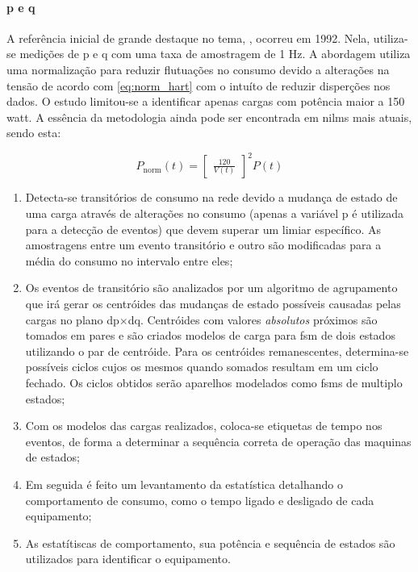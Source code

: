 \paragraph{\acrlong{p} e \acrlong{q}}

A referência inicial de grande destaque no tema,
\cite{nilm_hart_1992_8}, ocorreu em 1992. Nela, utiliza-se medições de
\gls{p} e \gls{q} com uma taxa de amostragem de 1 Hz. A abordagem
utiliza uma normalização para reduzir flutuações no consumo devido a
alterações na tensão de acordo com \ref{eq:norm_hart} com o intuíto de
reduzir disperções nos dados. O estudo limitou-se a identificar apenas
cargas com potência maior a 150 \acrshort{watt}. A essência da
metodologia ainda pode ser encontrada em \glspl{nilm} mais atuais, sendo
esta: 

\begin{equation} \label{eq:norm_hart}
P_{\text{norm}}(t) = 
\begin{bmatrix}
\frac{120}{V(t)}
\end{bmatrix}^2
P(t)
\end{equation}

\begin{enumerate}
\item Detecta-se transitórios de consumo na rede devido a mudança de
estado de uma carga através de alterações no consumo (apenas a
variável \gls{p} é utilizada para a detecção de eventos) que devem
superar um limiar específico. As amostragens entre um evento
transitório e outro são modificadas para a média do consumo no
intervalo entre eles; 
\item Os eventos de transitório são analizados por um algoritmo de
agrupamento que irá gerar os centróides das mudanças de estado
possíveis causadas pelas cargas no plano
\acrshort{dp}$\times$\acrshort{dq}.
Centróides com valores \emph{absolutos} próximos são tomados em
pares e são criados modelos de carga para \gls{fsm} de dois
estados utilizando o par de centróide. Para os centróides remanescentes, determina-se possíveis
ciclos cujos os mesmos quando somados resultam em um ciclo fechado. Os
ciclos obtidos serão aparelhos modelados como \glspl{fsm} de multiplo
estados;
\item Com os modelos das cargas realizados, coloca-se etiquetas de
tempo nos eventos, de forma a determinar a sequência correta de
operação das maquinas de estados;
\item Em seguida é feito um levantamento da estatística detalhando o
comportamento de consumo, como o tempo ligado e desligado de cada
equipamento;
\item As estatítiscas de comportamento, sua potência e sequência de
estados são utilizados para identificar o equipamento.
\end{enumerate}

